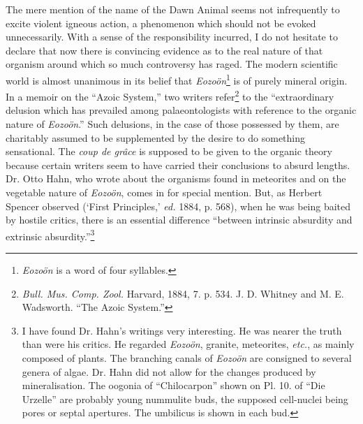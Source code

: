 \documentclass[a4paper, 12pt, oneside]{article}
\begin{document}
The mere mention of the name of the Dawn Animal seems not infrequently to excite violent igneous action, a phenomenon which should not be evoked unnecessarily. With a sense of the responsibility incurred, I do not hesitate to declare that now there is convincing evidence as to the real nature of that organism around which so much controversy has raged. The modern scientific world is almost unanimous in its belief that \emph{Eozoön}\footnote{\emph{Eozoön} is a word of four syllables.} is of purely mineral origin. In a memoir on the ``Azoic System,'' two writers refer\footnote{\emph{Bull. Mus. Comp. Zool.} Harvard, 1884, 7. p. 534. J. D. Whitney and M. E. Wadsworth. ``The Azoic System.''} to the ``extraordinary delusion which has prevailed among palaeontologists with reference to the organic nature of \emph{Eozoön}.'' Such delusions, in the case of those possessed by them, are charitably assumed to be supplemented by the desire to do something sensational. The \emph{coup de grâce} is supposed to be given to the organic theory because certain writers seem to have carried their conclusions to absurd lengths. Dr. Otto Hahn, who wrote about the organisms found in meteorites and on the vegetable nature of \emph{Eozoön}, comes in for special mention. But, as Herbert Spencer observed (`First Principles,' \emph{ed.} 1884, p. 568), when he was being baited by hostile critics, there is an essential difference ``between intrinsic absurdity and extrinsic absurdity.''\footnote{I have found Dr. Hahn's writings very interesting. He was nearer the truth than were his critics. He regarded \emph{Eozoön}, granite, meteorites, \emph{etc.}, as mainly composed of plants. The branching canals of \emph{Eozoön} are consigned to several genera of algae. Dr. Hahn did not allow for the changes produced by mineralisation. The oogonia of ``Chilocarpon'' shown on Pl. 10. of ``Die Urzelle'' are probably young nummulite buds, the supposed cell-nuclei being pores or septal apertures. The umbilicus is shown in each bud.}
\end{document}
